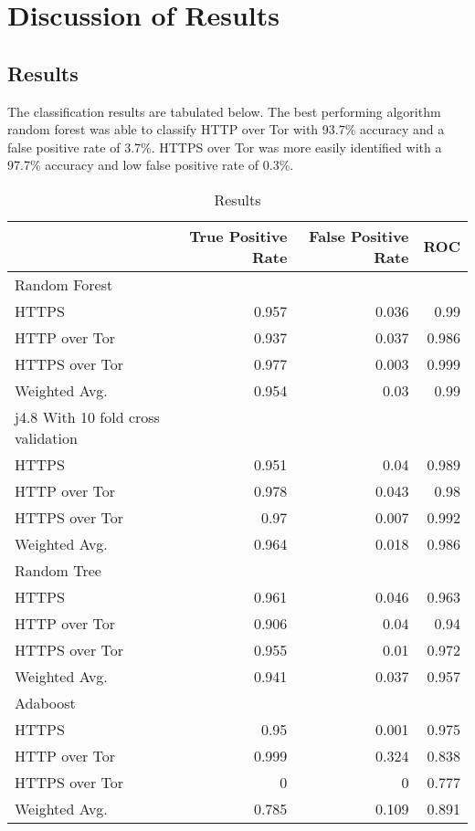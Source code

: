 \chapter{Discussion of Results}

\section{Results}

The classification results are tabulated below. The best performing algorithm
random forest was able to classify HTTP over Tor with 93.7\% accuracy and a
false positive rate of 3.7\%. HTTPS over Tor was more easily identified with a
97.7\% accuracy and low false positive rate of 0.3\%.

\begin{table}[H]
  \begin{tabular}{lrrr}
    \toprule
    & True Positive Rate & False Positive Rate & ROC \\
    \midrule
    Random Forest\\
    \midrule
    HTTPS & 0.957 & 0.036 & 0.99\\
    HTTP over Tor & 0.937 & 0.037 & 0.986\\
    HTTPS over Tor & 0.977 & 0.003 & 0.999\\
    Weighted Avg. & 0.954 & 0.03 & 0.99\\
    \midrule
    j4.8 With 10 fold cross validation\\
    \midrule
    HTTPS & 0.951 & 0.04 & 0.989\\
    HTTP over Tor & 0.978 & 0.043 & 0.98\\
    HTTPS over Tor & 0.97 & 0.007 & 0.992\\
    Weighted Avg. & 0.964 & 0.018 & 0.986\\
    \midrule
    Random Tree\\
    \midrule
    HTTPS & 0.961 & 0.046 & 0.963\\
    HTTP over Tor & 0.906 & 0.04 & 0.94\\
    HTTPS over Tor & 0.955 & 0.01 & 0.972\\
    Weighted Avg. & 0.941 & 0.037 & 0.957\\
    \midrule
    Adaboost\\
    \midrule
    HTTPS & 0.95 & 0.001 & 0.975\\
    HTTP over Tor & 0.999 & 0.324 & 0.838\\
    HTTPS over Tor & 0 & 0 & 0.777\\
    Weighted Avg. & 0.785 & 0.109 & 0.891\\
    \bottomrule
  \end{tabular}
  \caption{Results}
  \label{table:results}
\end{table}

